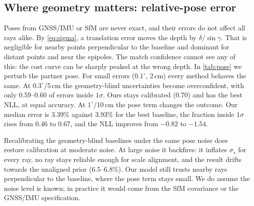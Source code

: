\begin{table}[t]
  \centering
  \small
  
  \caption{\textbf{Transfer without recalibration.} All methods are calibrated at $b=4$\,m and
  $256\times512$ and evaluated at other baselines and resolutions (5 scenes; 3 at $512\times1024$).}
  \label{tab:transfer}
  \label{sec:transfer}
\end{table}

\subsection{Where geometry matters: relative-pose error}
\label{sec:pose}

\begin{table}[t]
  \centering
  \small
  
  \caption{\textbf{Relative-pose error.} The partner pose given to every method is perturbed by
  rotation and translation noise with the stated per-axis standard deviations; the images themselves are
  rendered with the true poses. ``Refit'' means the geometry-blind baseline was recalibrated on
  calibration scenes with the same pose noise. Ours plugs the known noise level into the pose term of
  \cref{eq:sigma} and is \emph{not} recalibrated. 8 test scenes.}
  \label{tab:pose}
\end{table}

Poses from GNSS/IMU or SfM are never exact, and their errors do not affect all rays alike. By
\cref{eq:sigma}, a translation error moves the depth by $\delta/\sin\gamma$. That is negligible for
nearby points perpendicular to the baseline and dominant for distant points and near the epipoles. The
match confidence cannot see any of this: the cost curve can be sharply peaked at the wrong depth. In
\cref{tab:pose} we perturb the partner pose. For small errors ($0.1^\circ$, 2\,cm) every method
behaves the same. At $0.3^\circ$/5\,cm the geometry-blind uncertainties become overconfident, with
only 0.59--0.60 of errors inside $1\sigma$. Ours stays calibrated (0.70) and has the best NLL, at
equal accuracy. At $1^\circ$/10\,cm the pose term changes the outcome. Our median error is 3.39\%
against 3.93\% for the best baseline, the fraction inside $1\sigma$ rises from 0.46 to 0.67, and the
NLL improves from $-0.82$ to $-1.54$.

Recalibrating the geometry-blind baselines under the same pose noise does restore calibration at
moderate noise. At large noise it backfires: it inflates $\sigma_s$ for every ray, no ray stays
reliable enough for scale alignment, and the result drifts towards the unaligned prior (6.5--6.8\%).
Our model still trusts nearby rays perpendicular to the baseline, where the pose term stays small. We
do assume the noise level is known; in practice it would come from the SfM covariance or the GNSS/IMU
specification.

